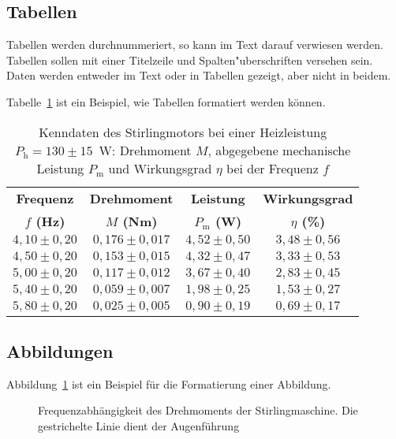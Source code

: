 \documentclass[a4paper,11pt]{article}
\begin{document}
\subsection{Tabellen}
Tabellen werden durchnummeriert, so kann im  Text  darauf  verwiesen werden.
Tabellen sollen mit einer  Titelzeile und Spalten"uberschriften versehen sein.
Daten werden entweder im Text oder in Tabellen gezeigt, aber nicht in beidem.

Tabelle~\ref{tab:Beispiel} ist ein Beispiel, wie Tabellen formatiert 
werden können.
\begin{table}
\begin{center}
\begin{tabular}{cccc}
\hline
\textbf{Frequenz} & \textbf{Drehmoment} 
           & \textbf{Leistung} & \textbf{Wirkungsgrad} \\ 
\textbf{$f$ (Hz)} & \textbf{$M$ (Nm)} 
           & \textbf{$P_\mathrm{m}$ (W)} & \textbf{$\eta$ (\%)} \\ \hline 
$4,10\pm 0,20$ & $0,176\pm 0,017$ & $4,52\pm 0,50$ & $3,48\pm 0,56$ \\
$4,50\pm 0,20$ & $0,153\pm 0,015$ & $4,32\pm 0,47$ & $3,33\pm 0,53$ \\
$5,00\pm 0,20$ & $0,117\pm 0,012$ & $3,67\pm 0,40$ & $2,83\pm 0,45$ \\
$5,40\pm 0,20$ & $0,059\pm 0,007$ & $1,98\pm 0,25$ & $1,53\pm 0,27$ \\
$5,80\pm 0,20$ & $0,025\pm 0,005$ & $0,90\pm 0,19$ & $0,69\pm 0,17$ \\ \hline
\end{tabular}
\caption{\label{tab:Beispiel}Kenndaten des Stirlingmotors bei einer Heizleistung 
    $P_\mathrm{h}=130\pm 15$~W: Drehmoment $M$, abgegebene mechanische Leistung
    $P_\mathrm{m}$ und Wirkungsgrad $\eta$ bei der Frequenz $f$}
\end{center}
\end{table} 



\subsection{Abbildungen}
Abbildung~\ref{abb:beispiel} ist ein Beispiel für die Formatierung
einer Abbildung.
\begin{figure}[t]
\begin{center}
\caption{Frequenzabhängigkeit des Drehmoments der Stirlingmaschine.
Die gestrichelte Linie dient der Augenführung}\label{abb:beispiel}
\end{center}
\end{figure} 
\end{document}
